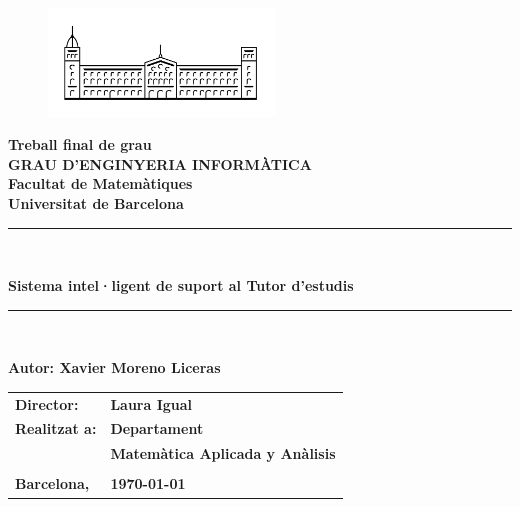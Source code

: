 \documentclass[11pt,a4paper,catalan]{article}
\newcommand{\titleTFG}{Sistema intel·ligent de suport al Tutor d'estudis}
\newcommand{\myname}{Xavier Moreno Liceras}
\begin{document}
\thispagestyle{empty}

\begin{titlepage}
\begin{center}
\begin{figure}[h]
\begin{center}
\includegraphics[width=6cm]{img/ub.png}
\end{center}
\end{figure}

\textbf{\LARGE Treball final de grau} \\
\vspace*{.5cm}
\textbf{\LARGE GRAU D'ENGINYERIA INFORMÀTICA } \\
\vspace*{.5cm}
\textbf{\LARGE Facultat de Matemàtiques \\ Universitat de Barcelona} \\
\vspace*{1.5cm}
\rule{\textwidth}{0.1mm}\\
\begin{Huge}
\textbf{\titleTFG} \\
\end{Huge}
\rule{\textwidth}{0.1mm}\\

\vspace{1cm}

\begin{flushright}
\textbf{\LARGE Autor: \myname}

\vspace*{2cm}

\renewcommand{\arraystretch}{1.5}
\begin{tabular}{ll}
\textbf{\Large Director:} & \textbf{\Large Laura Igual } \\
\textbf{\Large Realitzat a:} & \textbf{\Large  Departament   } \\
 & \textbf{\Large Matemàtica Aplicada y Anàlisis} \\
\\
\textbf{\Large Barcelona,} & \textbf{\Large \today }
\end{tabular}

\end{flushright}

\end{center}
\end{titlepage}
\end{document}

